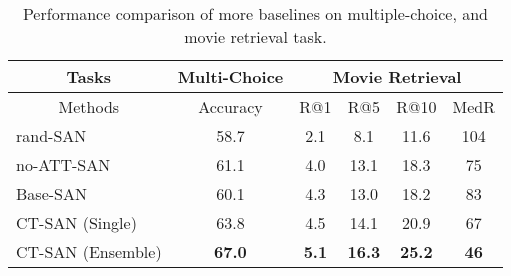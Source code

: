\documentclass[10pt,twocolumn,letterpaper]{article}
\theoremstyle{nonumberplain}
\begin{document}
\begin{table}[h!]
\centering
\small
\newcommand{\ul}[1]{{#1}}
\newcommand{\ranked}[1]{\xspace\scriptsize\sf{(#1)}}


\setlength\tabcolsep{3.0pt}
\begin{tabular}{|l|c|cccc|}
\hline
\multicolumn{1}{|c|}{Tasks }           & {\footnotesize Multi-Choice}   & \multicolumn{4}{c|}{\footnotesize Movie Retrieval}                       \\ \hline
\multicolumn{1}{|c|}{Methods}          & {Accuracy}    & R@1          & R@5           & R@10          & MedR        \\ \hline
\ul{rand-SAN}                          & \ul{58.7}     & 2.1          &  8.1          & 11.6          & 104         \\ \ul{no-ATT-SAN}                        & \ul{61.1}     & 4.0          & 13.1          & 18.3          & 75          \\ \hline
Base-SAN                               & 60.1          & 4.3          & 13.0          & 18.2          & 83          \\ CT-SAN (Single)                        & 63.8          & 4.5          & 14.1          & 20.9          & 67          \\ CT-SAN (Ensemble)                      & \textbf{67.0} & \textbf{5.1} & \textbf{16.3} & \textbf{25.2} & \textbf{46} \\ \hline
\end{tabular}

\medskip
\caption{
Performance comparison of more baselines on multiple-choice, and movie retrieval task.
}
\label{tbl:supp_experiments_mr}
\vspace{-7pt}
\end{table}
\end{document}
